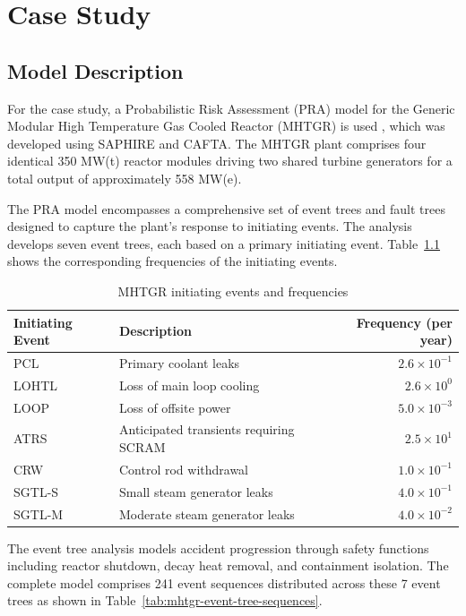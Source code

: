 \chapter{Case Study}
\label{chap:experiments}

\section{Model Description}

For the case study, a Probabilistic Risk Assessment (PRA) model for the Generic Modular High Temperature Gas Cooled Reactor (MHTGR) is used \cite{hamza_openpra-orggeneric-mhtgr-model_2025}, which was developed using SAPHIRE and CAFTA. The MHTGR plant comprises four identical 350 MW(t) reactor modules driving two shared turbine generators for a total output of approximately 558 MW(e).

The PRA model encompasses a comprehensive set of event trees and fault trees designed to capture the plant's response to initiating events. The analysis develops seven event trees, each based on a primary initiating event. Table~\ref{tab:mhtgr-initiating-events} shows the corresponding frequencies of the initiating events.

\begin{table}[]
\centering
\caption{MHTGR initiating events and frequencies}
\label{tab:mhtgr-initiating-events}
\begin{tabularx}{\textwidth}{l >{\RaggedRight}X r}
\toprule
\textbf{Initiating Event} & \textbf{Description} & \textbf{Frequency (per year)} \\
\midrule
PCL & Primary coolant leaks & $2.6 \times 10^{-1}$ \\
LOHTL & Loss of main loop cooling & $2.6 \times 10^{0}$ \\
LOOP & Loss of offsite power & $5.0 \times 10^{-3}$ \\
ATRS & Anticipated transients requiring SCRAM & $2.5 \times 10^{1}$ \\
CRW & Control rod withdrawal & $1.0 \times 10^{-1}$ \\
SGTL-S & Small steam generator leaks & $4.0 \times 10^{-1}$ \\
SGTL-M & Moderate steam generator leaks & $4.0 \times 10^{-2}$ \\
\bottomrule
\end{tabularx}
\end{table}

The event tree analysis models accident progression through safety functions including reactor shutdown, decay heat removal, and containment isolation. The complete model comprises 241 event sequences distributed across these 7 event trees as shown in Table~\ref{tab:mhtgr-event-tree-sequences}.

